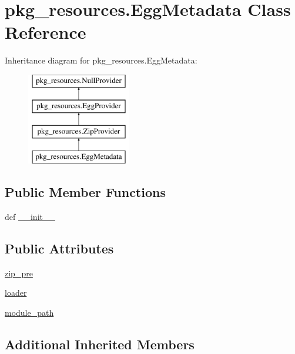 \hypertarget{classpkg__resources_1_1EggMetadata}{}\section{pkg\+\_\+resources.\+Egg\+Metadata Class Reference}
\label{classpkg__resources_1_1EggMetadata}
Inheritance diagram for pkg\+\_\+resources.\+Egg\+Metadata\+:\begin{figure}[H]
\begin{center}
\leavevmode
\includegraphics[height=4.000000cm]{classpkg__resources_1_1EggMetadata}
\end{center}
\end{figure}
\subsection*{Public Member Functions}
\begin{DoxyCompactItemize}
\item 
def \hyperlink{classpkg__resources_1_1EggMetadata_a3e3c62b6f239805c3d310ad76841e372}{\+\_\+\+\_\+init\+\_\+\+\_\+}
\end{DoxyCompactItemize}
\subsection*{Public Attributes}
\begin{DoxyCompactItemize}
\item 
\hyperlink{classpkg__resources_1_1EggMetadata_a5a1e0bd2d5340e574b3b532e8f21d363}{zip\+\_\+pre}
\item 
\hyperlink{classpkg__resources_1_1EggMetadata_abc7936ead6a706047cb2d52bf800557c}{loader}
\item 
\hyperlink{classpkg__resources_1_1EggMetadata_a41391e3d836916141fa95197550b1937}{module\+\_\+path}
\end{DoxyCompactItemize}
\subsection*{Additional Inherited Members}


